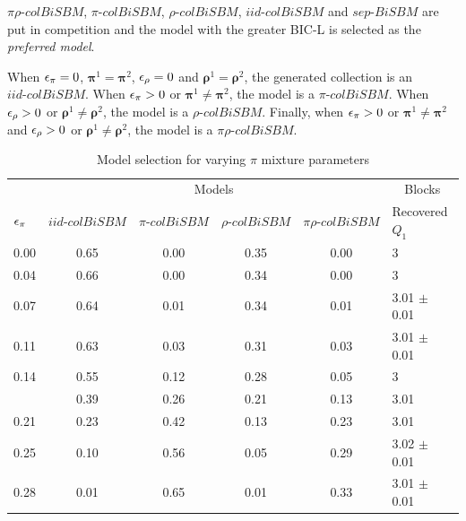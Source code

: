 \(\pi\rho\text{-}colBiSBM\), \(\pi\text{-}colBiSBM\),
\(\rho\text{-}colBiSBM\), \(iid\text{-}colBiSBM\) and
\(sep\text{-}BiSBM\) are put in competition and the model with the
greater BIC-L is selected as the \emph{preferred model}.

When \(\eps[\pi] = 0\), \(\bm{\pi}^1 = \bm{\pi}^2\), \(\eps[\rho] = 0\)
and \(\bm{\rho}^1 = \bm{\rho}^2\), the generated collection is an
\(iid\text{-}colBiSBM\). When \(\eps[\pi] > 0\) or
\(\bm{\pi}^1 \neq \bm{\pi}^2\), the model is a \(\pi\text{-}colBiSBM\).
When \(\eps[\rho] > 0\) or \(\bm{\rho}^1 \neq \bm{\rho}^2\), the model
is a \(\rho\text{-}colBiSBM\). Finally, when \(\eps[\pi] > 0\) or
\(\bm{\pi}^1 \neq \bm{\pi}^2\) and \(\eps[\rho] > 0\) or
\(\bm{\rho}^1 \neq \bm{\rho}^2\), the model is a
\(\pi\rho\text{-}colBiSBM\).

\begin{table}[!h]

\caption{\label{tab:tables}\label{tab:pi-model-sel}Model selection for varying $\pi$ mixture parameters}
\centering
\begin{tabular}[t]{lccccl}
\toprule
\multicolumn{1}{c}{ } & \multicolumn{4}{c}{Models} & \multicolumn{1}{c}{Blocks} \\
\cmidrule(l{3pt}r{3pt}){2-5} \cmidrule(l{3pt}r{3pt}){6-6}
$\eps[\pi]$ & $iid\text{-}colBiSBM$     & $\pi\text{-}colBiSBM$ & $\rho\text{-}colBiSBM$ & $\pi\rho\text{-}colBiSBM$ & Recovered $Q_1$\\
\midrule
0.00 & 0.65 & 0.00 & 0.35 & 0.00 & 3\\
0.04 & 0.66 & 0.00 & 0.34 & 0.00 & 3\\
0.07 & 0.64 & 0.01 & 0.34 & 0.01 & 3.01 $\pm$ 0.01\\
0.11 & 0.63 & 0.03 & 0.31 & 0.03 & 3.01 $\pm$ 0.01\\
0.14 & 0.55 & 0.12 & 0.28 & 0.05 & 3\\
\addlinespace
0.18 & 0.39 & 0.26 & 0.21 & 0.13 & 3.01\\
0.21 & 0.23 & 0.42 & 0.13 & 0.23 & 3.01\\
0.25 & 0.10 & 0.56 & 0.05 & 0.29 & 3.02 $\pm$ 0.01\\
0.28 & 0.01 & 0.65 & 0.01 & 0.33 & 3.01 $\pm$ 0.01\\
\bottomrule
\end{tabular}
\end{table}

